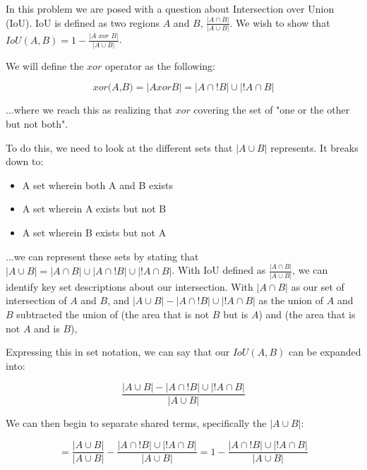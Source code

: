 \documentclass{article}
\begin{document}
In this problem we are posed with a question about Intersection over Union (IoU). IoU is defined as two regions $A$ and $B$, $\frac{|A \cap B|}{|A \cup B|}$. We wish to show that $IoU(A,B)=1 - \frac{|A \textit{ xor } B|}{|A \cup B|}$.

\noindent We will define the $\textit{xor}$ operator as the following:

\begin{equation}
    \textit{xor(A,B)} = | A \textit{xor} B | = |A \cap !B| \cup |!A \cap B|
\end{equation}

\noindent ...where we reach this as realizing that $\textit{xor}$ covering the set of "one or the other but not both".

\noindent To do this, we need to look at the different sets that $|A \cup B |$ represents. It breaks down to:

\begin{itemize}
    \item A set wherein both A and B exists
    \item A set wherein A exists but not B
    \item A set wherein B exists but not A
\end{itemize}

\noindent ...we can represent these sets by stating that $|A \cup B | = |A \cap B| \cup |A \cap !B| \cup |!A \cap B|$. With IoU defined as $\frac{|A \cap B|}{|A \cup B|}$, we can identify key set descriptions about our intersection. With $|A \cap B|$ as our set of intersection of $A$ and $B$, and $|A \cup B| - |A \cap !B| \cup |!A \cap B|$ as the union of $A$ and $B$ subtracted the union of (the area that is not $B$ but is $A$) and (the area that is not $A$ and is $B$),

\noindent Expressing this in set notation, we can say that our $IoU(A,B)$ can be expanded into:

\begin{equation}
    \frac{|A \cup B | - |A \cap ! B | \cup |!A \cap B|}{|A \cup B|}
\end{equation}

\noindent We can then begin to separate shared terms, specifically the $|A \cup B|$:

\begin{equation}
    = \frac{|A \cup B|}{|A \cup B|} - \frac{|A \cap ! B | \cup |!A \cap B|}{|A \cup B|} = 1 - \frac{|A \cap ! B | \cup |!A \cap B|}{|A \cup B|}
\end{equation}
\end{document}
